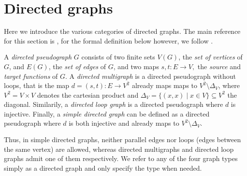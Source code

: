 




\section{Directed graphs}\label{sec:directed_graphs}


Here we introduce the various categories of directed graphs. The main
reference for this section is \textcite{Bang-Jensen_Digraphs}, for the
formal definition below however, we
follow \textcite{nLab}.

\begin{definition}
    
   
  \label{def:directed_graphs}  
  A \textit{directed pseudograph} $G$ consists  of two finite
 sets
  $V(G)$, the \textit{set of vertices}  of $G$, and $E(G)$, the \textit{set of
    edges} of $G$, and two maps $ s,t: E \to V, $ the \textit{source}
  and \textit{target functions} of $G$. A \textit{directed multigraph}
  is a directed pseudograph without loops, that is the map $d =
  (s,t):E \to V^2$ already maps maps to $V^2\setminus\Delta_V$, where
  $V^2 = V \times V$ denotes the cartesian product and $\Delta_V =
  \{(x,x) \mid x \in V\} \subseteq V^2$ the diagonal. Similarily, a
  \textit{directed loop graph} is a directed pseudograph where $d$ is
  injective. Finally, a \textit{simple directed graph} can be defined
  as a directed pseudograph where $d$ is both injective and already
  maps to $V^2\setminus\Delta_V$.
\end{definition}

Thus, in simple directed graphs, neither parallel edges nor loops
(edges between the same vertex) are allowed, whereas directed
multigraphs and directed loop graphs admit one of them
respectively. We refer to any of the four graph types simply as a
directed graph and only specify the type when needed.



